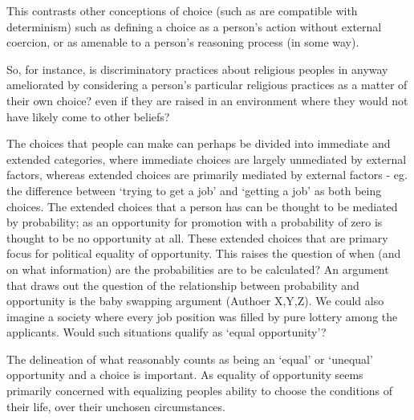 \documentclass{article}
\begin{document}
This contrasts other conceptions of choice (such as are compatible with determinism) such as defining a choice as a person's action without external coercion, or as amenable to a person's reasoning process (in some way).

So, for instance, is discriminatory practices about religious peoples in anyway ameliorated by considering a person's particular religious practices as a matter of their own choice? even if they are raised in an environment where they would not have likely come to other beliefs?

The choices that people can make can perhaps be divided into immediate and extended categories, where immediate choices are largely unmediated by external factors, whereas extended choices are primarily mediated by external factors - eg. the difference between `trying to get a job' and `getting a job' as both being choices.
The extended choices that a person has can be thought to be mediated by probability; as an opportunity for promotion with a probability of zero is thought to be no opportunity at all. These extended choices that are primary focus for political equality of opportunity.
This raises the question of when (and on what information) are the probabilities are to be calculated?
An argument that draws out the question of the relationship between probability and opportunity is the baby swapping argument (Authoer X,Y,Z). We could also imagine a society where every job position was filled by pure lottery among the applicants. Would such situations qualify as `equal opportunity'?

The delineation of what reasonably counts as being an `equal' or `unequal' opportunity and a choice is important. As equality of opportunity seems primarily concerned with equalizing peoples ability to choose the conditions of their life, over their unchosen circumstances.
\end{document}
